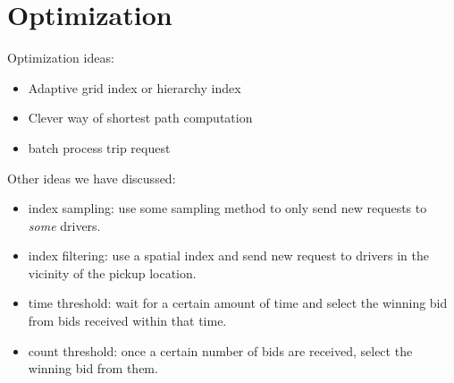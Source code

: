 \section{Optimization}
Optimization ideas:
\begin{itemize}
	\item Adaptive grid index or hierarchy index
	\item Clever way of shortest path computation
	\item batch process trip request
\end{itemize}

Other ideas we have discussed:
\begin{itemize}
\item index sampling: use some sampling method to only send new requests to \emph{some} drivers.
\item index filtering: use a spatial index and send new request to drivers in the vicinity of the pickup location.
\item time threshold: wait for a certain amount of time and select the winning bid from bids received within that time. 
\item count threshold: once a certain number of bids are received, select the winning bid from them.
\end{itemize}